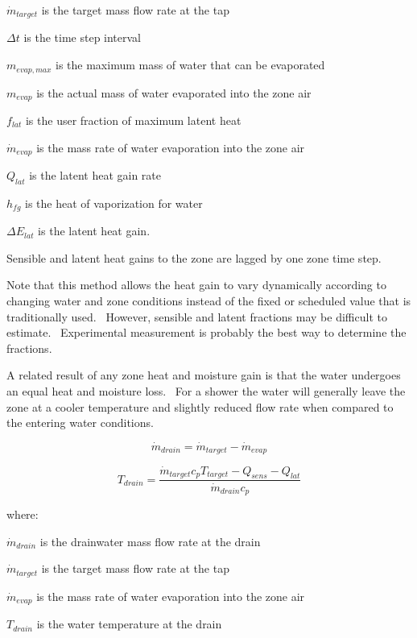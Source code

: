 \({\dot m_{target}}\) is the target mass flow rate at the tap

\(\Delta t\) is the time step interval

\({m_{evap,max}}\) is the maximum mass of water that can be evaporated

\({m_{evap}}\) is the actual mass of water evaporated into the zone air

\({f_{lat}}\) is the user fraction of maximum latent heat

\({\dot m_{evap}}\) is the mass rate of water evaporation into the zone air

\({Q_{lat}}\) is the latent heat gain rate

\({h_{fg}}\) is the heat of vaporization for water

\(\Delta {E_{lat}}\) is the latent heat gain.

Sensible and latent heat gains to the zone are lagged by one zone time step.

Note that this method allows the heat gain to vary dynamically according to changing water and zone conditions instead of the fixed or scheduled value that is traditionally used.~ However, sensible and latent fractions may be difficult to estimate.~ Experimental measurement is probably the best way to determine the fractions.

A related result of any zone heat and moisture gain is that the water undergoes an equal heat and moisture loss.~ For a shower the water will generally leave the zone at a cooler temperature and slightly reduced flow rate when compared to the entering water conditions.

\begin{equation}
{\dot m_{drain}} = {\dot m_{target}} - {\dot m_{evap}}
\end{equation}

\begin{equation}
{T_{drain}} = \frac{{{{\dot m}_{target}}{c_p}{T_{target}} - {Q_{sens}} - {Q_{lat}}}}{{{{\dot m}_{drain}}{c_p}}}
\end{equation}

where:

\({\dot m_{drain}}\) is the drainwater mass flow rate at the drain

\({\dot m_{target}}\) is the target mass flow rate at the tap

\({\dot m_{evap}}\) is the mass rate of water evaporation into the zone air

\({T_{drain}}\) is the water temperature at the drain

